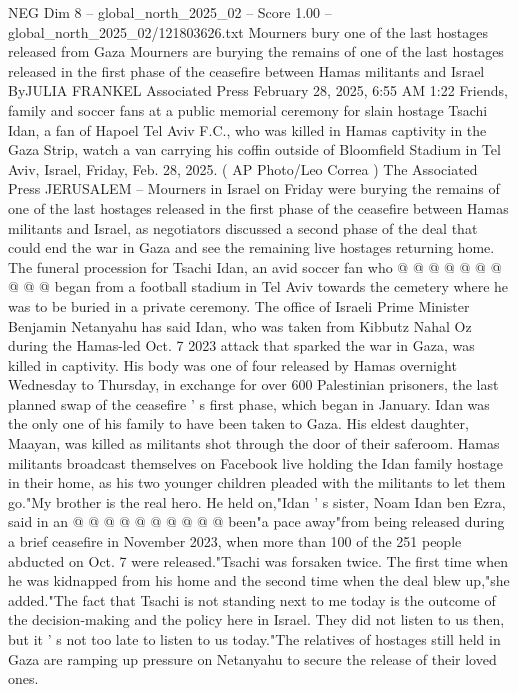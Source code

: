 \begin{textsample}{NEG Dim 8 – global\_north\_2025\_02 – Score 1.00 – global\_north\_2025\_02/121803626.txt}  \label{ex:f8_neg_433}
Mourners bury one of the last hostages released from Gaza Mourners are burying the remains of one of the last hostages released in the first phase of the ceasefire between Hamas militants and Israel ByJULIA FRANKEL Associated Press February 28, 2025, 6:55 AM 1:22 Friends, family and soccer fans at a public memorial ceremony for slain hostage Tsachi Idan, a fan of Hapoel Tel Aviv F.C., who was killed in Hamas captivity in the Gaza Strip, watch a van carrying his coffin outside of Bloomfield Stadium in Tel Aviv, Israel, Friday, Feb. 28, 2025. ( AP Photo/Leo Correa ) The Associated Press JERUSALEM -- Mourners in Israel on Friday were burying the remains of one of the last hostages released in the first phase of the ceasefire between Hamas militants and Israel, as negotiators discussed a second phase of the deal that could end the war in Gaza and see the remaining live hostages returning home.
The funeral procession for Tsachi Idan, an avid soccer fan who @ @ @ @ @ @ @ @ @ @ began from a football stadium in Tel Aviv towards the cemetery where he was to be buried in a private ceremony.
The office of Israeli Prime Minister Benjamin Netanyahu has said Idan, who was taken from Kibbutz Nahal Oz during the Hamas-led Oct. 7 2023 attack that sparked the war in Gaza, was killed in captivity.
His body was one of four released by Hamas overnight Wednesday to Thursday, in exchange for over 600 Palestinian prisoners, the last planned swap of the ceasefire ' s first phase, which began in January.
Idan was the only one of his family to have been taken to Gaza.
His eldest daughter, Maayan, was killed as militants shot through the door of their saferoom.
Hamas militants broadcast themselves on Facebook live holding the Idan family hostage in their home, as his two younger children pleaded with the militants to let them go."My brother is the real hero.
He held on,"Idan ' s sister, Noam Idan ben Ezra, said in an @ @ @ @ @ @ @ @ @ @ been"a pace away"from being released during a brief ceasefire in November 2023, when more than 100 of the 251 people abducted on Oct. 7 were released."Tsachi was forsaken twice.
The first time when he was kidnapped from his home and the second time when the deal blew up,"she added."The fact that Tsachi is not standing next to me today is the outcome of the decision-making and the policy here in Israel.
They did not listen to us then, but it ' s not too late to listen to us today."The relatives of hostages still held in Gaza are ramping up pressure on Netanyahu to secure the release of their loved ones.

\end{textsample}
